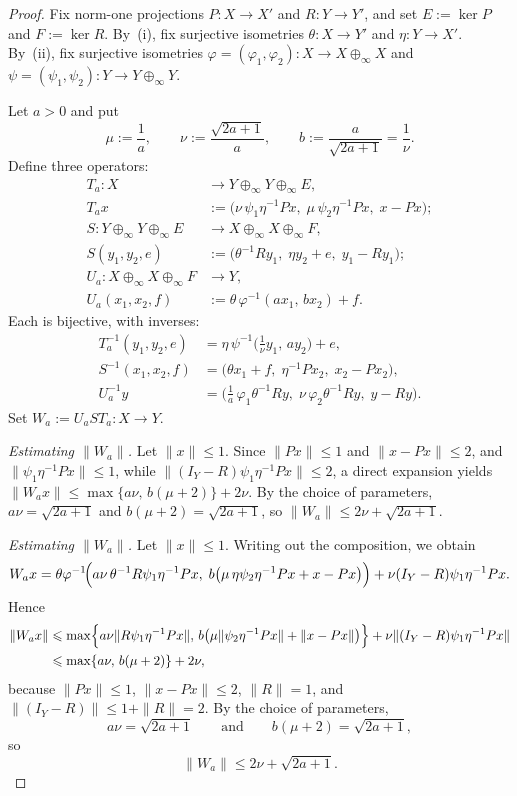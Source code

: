 \documentclass[11pt]{amsart}
\renewcommand{\le}{\leqslant}
\theoremstyle{definition}
\theoremstyle{remark}
\theoremstyle{plain}
\numberwithin{equation}{section}
\begin{document}
\begin{proof}
Fix norm-one projections $P\colon X\to X'$ and $R\colon Y\to Y'$, and
set $E:=\ker P$ and $F:=\ker R$.  By~(i), fix surjective isometries
$\theta\colon X\to Y'$ and $\eta\colon Y\to X'$.  By~(ii), fix
surjective isometries
$\varphi=(\varphi_1,\varphi_2)\colon X\to X\oplus_\infty X$ and
$\psi=(\psi_1,\psi_2)\colon Y\to Y\oplus_\infty Y$.

Let $a>0$ and put
\[
\mu:=\frac{1}{a},\qquad
\nu:=\frac{\sqrt{2a+1}}{a},\qquad
b:=\frac{a}{\sqrt{2a+1}}=\frac{1}{\nu}.
\]
Define three operators:
\begin{align*}
T_a\colon X&\to Y\oplus_\infty Y\oplus_\infty E,\\
T_a x&:=\bigl(\nu\,\psi_1\eta^{-1}Px,\;
\mu\,\psi_2\eta^{-1}Px,\; x-Px\bigr);\\[2mm]
S\colon Y\oplus_\infty Y\oplus_\infty E
&\to X\oplus_\infty X\oplus_\infty F,\\
S(y_1,y_2,e)&:=\bigl(\theta^{-1}Ry_1,\;
\eta y_2+e,\; y_1-Ry_1\bigr);\\[2mm]
U_a\colon X\oplus_\infty X\oplus_\infty F&\to Y,\\
U_a(x_1,x_2,f)&:=\theta\,\varphi^{-1}(ax_1,\,bx_2)+f.
\end{align*}
Each is bijective, with inverses:
\begin{align*}
T_a^{-1}(y_1,y_2,e)
&=\eta\,\psi^{-1}\!\bigl(\tfrac{1}{\nu}y_1,\,ay_2\bigr)+e,\\
S^{-1}(x_1,x_2,f)
&=\bigl(\theta x_1+f,\;\eta^{-1}Px_2,\;x_2-Px_2\bigr),\\
U_a^{-1}y
&=\bigl(\tfrac{1}{a}\,\varphi_1\theta^{-1}Ry,\;
\nu\,\varphi_2\theta^{-1}Ry,\;y-Ry\bigr).
\end{align*}
Set $W_a:=U_aST_a\colon X\to Y$.

\smallskip
\noindent\emph{Estimating $\|W_a\|$.}
Let $\|x\|\le 1$.  Since $\|Px\|\le 1$ and $\|x-Px\|\le 2$,
and $\|\psi_1\eta^{-1}Px\|\le 1$, while
$\|(I_Y-R)\psi_1\eta^{-1}Px\|\le 2$, a direct expansion yields
$\|W_ax\|\le\max\{a\nu,\,b(\mu+2)\}+2\nu$.
By the choice of parameters, $a\nu=\sqrt{2a+1}$ and
$b(\mu+2)=\sqrt{2a+1}$, so
$\|W_a\|\le 2\nu+\sqrt{2a+1}$.

\smallskip
\noindent\emph{Estimating $\|W_a\|$.}
Let $\|x\|\le 1$.  Writing out the composition, we obtain
\[
W_ax
=
\theta\varphi^{-1}\!\Bigl(
a\nu\,\theta^{-1}R\psi_1\eta^{-1}Px,\;
b\bigl(\mu\,\eta\psi_2\eta^{-1}Px+x-Px\bigr)
\Bigr)
+
\nu(I_Y-R)\psi_1\eta^{-1}Px.
\]
Hence
\begin{align*}
\|W_ax\|
&\le
\max\Bigl\{
a\nu\|R\psi_1\eta^{-1}Px\|,
\,b\bigl(\mu\|\psi_2\eta^{-1}Px\|+\|x-Px\|\bigr)
\Bigr\}
+\nu\|(I_Y-R)\psi_1\eta^{-1}Px\| \\
&\le \max\{a\nu,\,b(\mu+2)\}+2\nu,
\end{align*}
because $\|Px\|\le 1$, $\|x-Px\|\le 2$, $\|R\|=1$, and
$\|(I_Y-R)\|\le 1+\|R\|=2$.
By the choice of parameters,
\[
a\nu=\sqrt{2a+1}
\qquad\text{and}\qquad
b(\mu+2)=\sqrt{2a+1},
\]
so
\[
\|W_a\|\le 2\nu+\sqrt{2a+1}.
\]


\end{proof}
\end{document}
